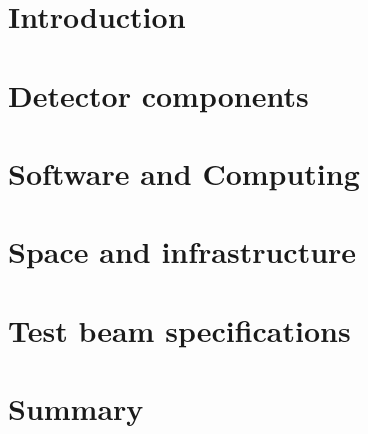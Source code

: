 \ifdefined\isfinal\documentclass[final]{pd-tdr}\else\documentclass{pd-tdr}\fi
\begin{document}



\chapter{Introduction}


\chapter{Detector components} 


\chapter{Software and Computing}


\chapter{Space and infrastructure}


\chapter{Test beam specifications} 


\chapter{Summary}
%

\cleardoublepage


\end{document}
